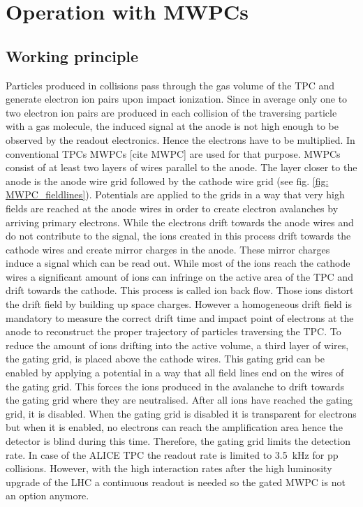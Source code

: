 \section{Operation with MWPCs}
\subsection{Working principle}
Particles produced in collisions pass through the gas volume of the TPC and generate electron ion pairs upon impact ionization. Since in average only one to two electron ion pairs are produced in each collision of the traversing particle with a gas molecule, the induced signal at the anode is not high enough to be observed by the readout electronics. Hence the electrons have to be multiplied. In conventional TPCs MWPCs [cite MWPC] are used for that purpose. MWPCs consist of at least two layers of wires parallel to the anode. The layer closer to the anode is the anode wire grid followed by the cathode wire grid (see fig. \ref{fig: MWPC_fieldlines}). Potentials are applied to the grids in a way that very high fields are reached at the anode wires in order to create electron avalanches by arriving primary electrons. While the electrons drift towards the anode wires and do not contribute to the signal, the ions created in this process drift towards the cathode wires and create mirror charges in the anode. These mirror charges induce a signal which can be read out. While most of the ions reach the cathode wires a significant amount of ions can infringe on the active area of the TPC and drift towards the cathode. This process is called ion back flow. Those ions distort the drift field by building up space charges. However a homogeneous drift field is mandatory to measure the correct drift time and impact point of electrons at the anode to reconstruct the proper trajectory of particles traversing the TPC. To reduce the amount of ions drifting into the active volume, a third layer of wires, the gating grid, is placed above the cathode wires. This gating grid can be enabled by applying a potential in a way that all field lines end on the wires of the gating grid. This forces the ions produced in the avalanche to drift towards the gating grid where they are neutralised. After all ions have reached the gating grid, it is disabled. When the gating grid is disabled it is transparent for electrons but when it is enabled, no electrons can reach the amplification area hence the detector is blind during this time. Therefore, the gating grid limits the detection rate. In case of the ALICE TPC the readout rate is limited to \SI{3.5}{\kilo\hertz} for pp collisions. However, with the high interaction rates after the high luminosity upgrade of the LHC a continuous readout is needed so the gated MWPC is not an option anymore.  
